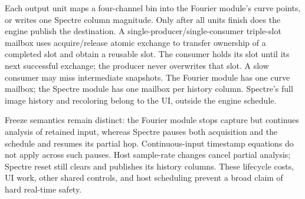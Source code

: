 Each output unit maps a four-channel bin into the Fourier module's curve
points, or writes one Spectre column magnitude. Only after all units finish
does the engine publish the destination. A single-producer/single-consumer
triple-slot mailbox uses acquire/release atomic exchange to transfer ownership
of a completed slot and obtain a reusable slot. The consumer holds its slot
until its next successful exchange; the producer never overwrites that slot. A
slow consumer may miss intermediate snapshots. The Fourier module has one curve
mailbox; the Spectre module has one mailbox per history column. Spectre's full
image history and recoloring belong to the UI, outside the engine schedule.

Freeze semantics remain distinct: the Fourier module stops capture but
continues analysis of retained input, whereas Spectre pauses both acquisition
and the schedule and resumes its partial hop. Continuous-input timestamp
equations do not apply across such pauses. Host sample-rate changes cancel
partial analysis; Spectre reset still clears and publishes its history columns.
These lifecycle costs, UI work, other shared controls, and host scheduling
prevent a broad claim of hard real-time safety.
